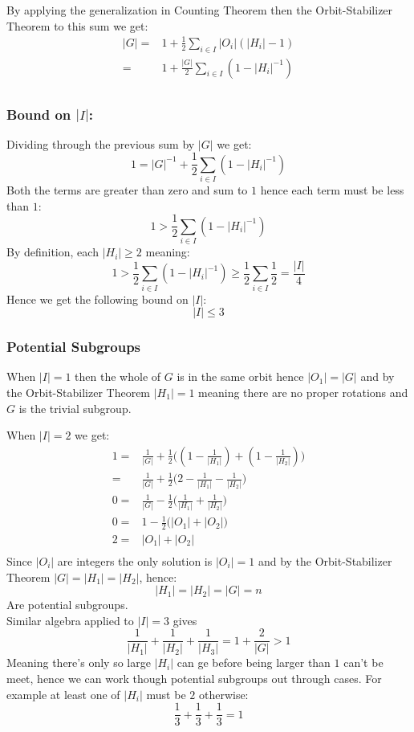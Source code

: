 By applying the generalization in Counting Theorem then the Orbit-Stabilizer Theorem to this sum we get:
\[\begin{aligned}
|G| =& 1+\frac{1}{2}\sum_{i\in I}|O_i|(|H_i|-1)\\
=& 1+\frac{|G|}{2}\sum_{i\in I}(1-|H_i|^{-1})\\
\end{aligned}\]

\subsubsection{Bound on $|I|$:}
Dividing through the previous sum by $|G|$ we get:
\[1 = |G|^{-1}+\frac{1}{2}\sum_{i\in I}(1-|H_i|^{-1})\]
Both the terms are greater than zero and sum to $1$ hence each term must be less than $1$:
\[1>\frac{1}{2}\sum_{i\in I}(1-|H_i|^{-1})\]
By definition,
each $|H_i|\geq 2$ meaning: 
\[1>\frac{1}{2}\sum_{i\in I}(1-|H_i|^{-1}) \geq \frac{1}{2}\sum_{i\in I}\frac{1}{2} = \frac{|I|}{4}\]
Hence we get the following bound on $|I|$:
\[|I|\leq 3\] 

\subsubsection{Potential Subgroups}
When $|I|=1$ then the whole of $G$ is in the same orbit hence $|O_1|=|G|$ and by the Orbit-Stabilizer Theorem $|H_1|=1$ meaning there are no proper rotations and $G$ is the trivial subgroup.

When $|I|=2$ we get:
\[\begin{aligned}
1 =& \frac{1}{|G|} + \frac{1}{2}\bigg(\left(1-\frac{1}{|H_1|}\right)+\left(1-\frac{1}{|H_2|}\right)\bigg)\\
=& \frac{1}{|G|} + \frac{1}{2}\bigg(2-\frac{1}{|H_1|}-\frac{1}{|H_2|}\bigg)\\
0=& \frac{1}{|G|} - \frac{1}{2}\bigg(\frac{1}{|H_1|}+\frac{1}{|H_2|}\bigg)\\
0=& 1- \frac{1}{2}\bigg(|O_1|+|O_2|\bigg)\\
2=& |O_1|+|O_2|\\
\end{aligned}\]
Since $|O_i|$ are integers the only solution is $|O_i|=1$ and by the Orbit-Stabilizer Theorem $|G| = |H_1| = |H_2|$,
hence:
\[|H_1| = |H_2| =|G|=n\]
Are potential subgroups.
\\

Similar algebra applied to $|I|=3$ gives
\[\frac{1}{|H_1|}+\frac{1}{|H_2|}+\frac{1}{|H_3|}=1+\frac{2}{|G|}  > 1\]
Meaning there's only so large $|H_i|$ can ge before being larger than $1$ can't be meet,
hence we can work though potential subgroups out through cases.
For example at least one of $|H_i|$ must be $2$ otherwise:
\[\frac{1}{3}+\frac{1}{3}+\frac{1}{3} =1\]


